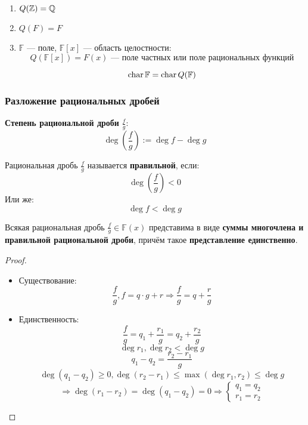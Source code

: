 \begin{example}
  \begin{enumerate}
    \item $Q(\mathbb{Z}) = \mathbb{Q}$
    \item $Q(F) = F$
    \item $\mathbb{F}$ --- поле, $\mathbb{F}[x]$ --- область целостности:
      \[
      Q(\mathbb{F}[x]) = F(x) \text{ --- поле частных или поле рациональных функций}
      \]
      \begin{note}
        \[
        \operatorname{char} \mathbb{F} = \operatorname{char} Q(\mathbb{F}) 
        \]
      \end{note}
  \end{enumerate}
\end{example}


\subsubsection{Разложение рациональных дробей}
\begin{definition}
  \textbf{Степень рациональной дроби} $\frac{f}{g}$:
  \[
  \deg \left(\frac{f}{g}\right) := \deg f - \deg g
  \]
\end{definition}
\begin{definition}
  Рациональная дробь $\frac{f}{g}$ называется \textbf{правильной}, если:
  \[
  \deg\left(\frac{f}{g}\right) < 0
  \]
  Или же:
  \[
  \deg f < \deg g
  \]
\end{definition}
\begin{statement}
  \label{statement:03_1}
  Всякая рациональная дробь $\frac{f}{g} \in \mathbb{F}(x)$ представима в виде \textbf{суммы многочлена и правильной рациональной дроби}, причём такое \textbf{представление единственно}.
\end{statement}
\begin{proof}
  \begin{itemize}
    \item Существование: 
      \[
      \frac{f}{g}, f = q \cdot g + r \Rightarrow \frac{f}{g} = q + \frac{r}{g}
      \]
    \item Единственность:
      \[
     \frac{f}{g} = q_1 + \frac{r_1}{g}  = q_2 + \frac{r_2}{g}
      \]
      \[
      \deg r_1, \deg r_2 < \deg g
      \]
      \[
      q_1 - q_2 = \frac{r_2 - r_1}{g}
      \]
      \[
      \deg (q_1 - q_2) \geq 0, \deg (r_2 - r_1) \leq \max(\deg r_1, r_2) \leq \deg g
      \]
      \[
      \Rightarrow \deg (r_1 - r_2) = \deg (q_1 - q_2) = 0 \Rightarrow \begin{cases}
      q_1 = q_2 \\
      r_1 = r_2
      \end{cases} 
      \]
  \end{itemize}
\end{proof}
